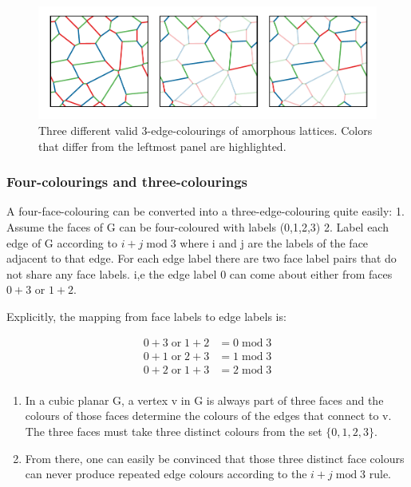 \begin{figure}
\hypertarget{fig:multiple_colourings}{%
\centering
\includegraphics[width=1\textwidth,height=\textheight]{figure_code/amk_chapter/multiple_colourings/multiple_colourings.pdf}
\caption{Three different valid 3-edge-colourings of amorphous lattices. Colors that differ from the leftmost panel are highlighted.}\label{fig:multiple_colourings}
}
\end{figure}

\hypertarget{four-colourings-and-three-colourings}{%
\subsubsection{Four-colourings and three-colourings}\label{four-colourings-and-three-colourings}}

A four-face-colouring can be converted into a three-edge-colouring quite easily: 1. Assume the faces of G can be four-coloured with labels (0,1,2,3) 2. Label each edge of G according to \(i + j \;\textrm{mod}\; 3\) where i and j are the labels of the face adjacent to that edge. For each edge label there are two face label pairs that do not share any face labels. i,e the edge label \(0\) can come about either from faces \(0 + 3\) or \(1 + 2\).

Explicitly, the mapping from face labels to edge labels is:

\[\begin{aligned}
0 + 3 \;\mathrm{or}\; 1 + 2 &= 0 \;\mathrm{mod}\; 3\\ 
0 + 1 \;\mathrm{or}\; 2 + 3 &= 1 \;\mathrm{mod}\; 3\\
0 + 2 \;\mathrm{or}\;1 + 3 &= 2 \;\mathrm{mod}\; 3\\
\end{aligned}
\]

\begin{enumerate}
\def\labelenumi{\arabic{enumi}.}
\setcounter{enumi}{2}
\item
  In a cubic planar G, a vertex v in G is always part of three faces and the colours of those faces determine the colours of the edges that connect to v. The three faces must take three distinct colours from the set \(\{0,1,2,3\}\).
\item
  From there, one can easily be convinced that those three distinct face colours can never produce repeated edge colours according to the \(i+j \;\mathrm{mod}\; 3\) rule.
\end{enumerate}

